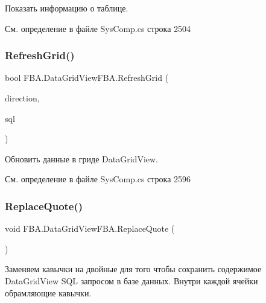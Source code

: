 Показать информацию о таблице. 



См. определение в файле Sys\+Comp.\+cs строка 2504

\mbox{\label{class_f_b_a_1_1_data_grid_view_f_b_a_a15f0d44e7a2aa8101ac8f21803244c86}} 
\subsubsection{\texorpdfstring{Refresh\+Grid()}{RefreshGrid()}}
{\footnotesize\ttfamily bool F\+B\+A.\+Data\+Grid\+View\+F\+B\+A.\+Refresh\+Grid (\begin{DoxyParamCaption}\item[{\mbox{\hyperlink{namespace_f_b_a_a6ff7d5c242d98046d1980715b06d7300}{Direction\+Query}}}]{direction,  }\item[{string}]{sql }\end{DoxyParamCaption})}



Обновить данные в гриде Data\+Grid\+View. 



См. определение в файле Sys\+Comp.\+cs строка 2596

\mbox{\label{class_f_b_a_1_1_data_grid_view_f_b_a_aa027e50add0c812eb94c2167ce3c7500}} 
\subsubsection{\texorpdfstring{Replace\+Quote()}{ReplaceQuote()}}
{\footnotesize\ttfamily void F\+B\+A.\+Data\+Grid\+View\+F\+B\+A.\+Replace\+Quote (\begin{DoxyParamCaption}{ }\end{DoxyParamCaption})}



Заменяем кавычки на двойные для того чтобы сохранить содержимое Data\+Grid\+View S\+QL запросом в базе данных. Внутри каждой ячейки обрамляющие кавычки. 




